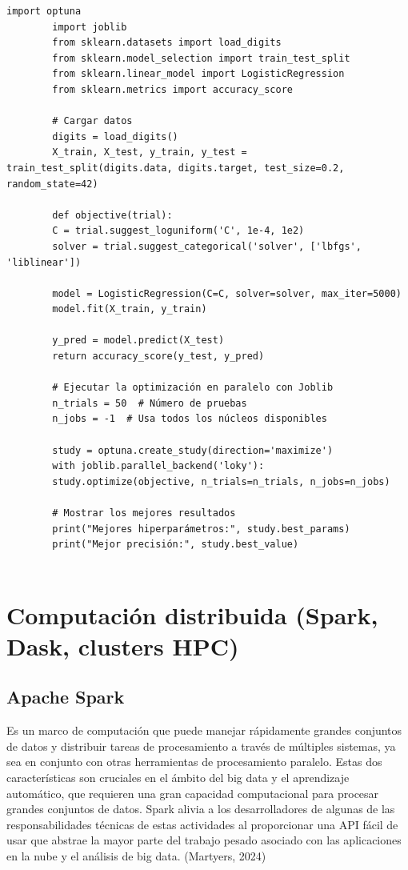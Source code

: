 	
	\begin{lstlisting}[caption={Escalado de algoritmos de optimización}]
		import optuna
		import joblib
		from sklearn.datasets import load_digits
		from sklearn.model_selection import train_test_split
		from sklearn.linear_model import LogisticRegression
		from sklearn.metrics import accuracy_score
		
		# Cargar datos
		digits = load_digits()
		X_train, X_test, y_train, y_test = train_test_split(digits.data, digits.target, test_size=0.2, random_state=42)
		
		def objective(trial):
		C = trial.suggest_loguniform('C', 1e-4, 1e2)
		solver = trial.suggest_categorical('solver', ['lbfgs', 'liblinear'])
		
		model = LogisticRegression(C=C, solver=solver, max_iter=5000)
		model.fit(X_train, y_train)
		
		y_pred = model.predict(X_test)
		return accuracy_score(y_test, y_pred)
		
		# Ejecutar la optimización en paralelo con Joblib
		n_trials = 50  # Número de pruebas
		n_jobs = -1  # Usa todos los núcleos disponibles
		
		study = optuna.create_study(direction='maximize')
		with joblib.parallel_backend('loky'):
		study.optimize(objective, n_trials=n_trials, n_jobs=n_jobs)
		
		# Mostrar los mejores resultados
		print("Mejores hiperparámetros:", study.best_params)
		print("Mejor precisión:", study.best_value)
		
	\end{lstlisting}
	
	
	\section{Computación distribuida (Spark, Dask, clusters HPC)}
	
	\subsection{Apache Spark}
	
	Es un marco de computación que puede manejar rápidamente grandes conjuntos de datos y distribuir tareas de procesamiento a través de múltiples sistemas, ya sea en conjunto con otras herramientas de procesamiento paralelo. Estas dos características son cruciales en el ámbito del big data y el aprendizaje automático, que requieren una gran capacidad computacional para procesar grandes conjuntos de datos. Spark alivia a los desarrolladores de algunas de las responsabilidades técnicas de estas actividades al proporcionar una API fácil de usar que abstrae la mayor parte del trabajo pesado asociado con las aplicaciones en la nube y el análisis de big data. (Martyers, 2024)
	
